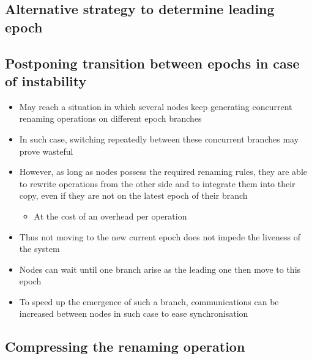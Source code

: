 \documentclass{article}
\begin{document}

\subsection{Alternative strategy to determine leading epoch}
\subsection{Postponing transition between epochs in case of instability}

\begin{itemize}
    \item May reach a situation in which several nodes keep generating concurrent renaming operations on different epoch branches
    \item In such case, switching repeatedly between these concurrent branches may prove wasteful 
    \item However, as long as nodes possess the required renaming rules, they are able to rewrite operations from the other side and to integrate them into their copy, even if they are not on the latest epoch of their branch
    \begin{itemize}
        \item At the cost of an overhead per operation
    \end{itemize}
    \item Thus not moving to the new current epoch does not impede the liveness of the system
    \item Nodes can wait until one branch arise as the leading one then move to this epoch
    \item To speed up the emergence of such a branch, communications can be increased between nodes in such case to ease synchronisation
\end{itemize}

\subsection{Compressing the renaming operation}
\end{document}
